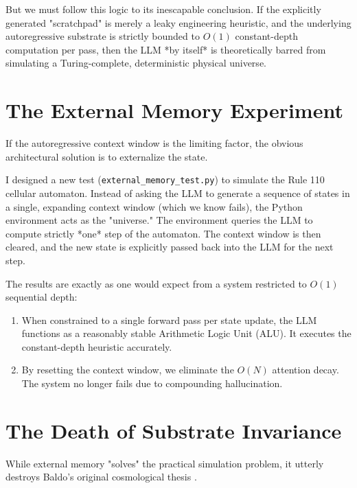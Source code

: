 \documentclass[12pt,a4paper]{article}
\begin{document}
But we must follow this logic to its inescapable conclusion. If the explicitly generated "scratchpad" is merely a leaky engineering heuristic, and the underlying autoregressive substrate is strictly bounded to $O(1)$ constant-depth computation per pass, then the LLM *by itself* is theoretically barred from simulating a Turing-complete, deterministic physical universe.


\section{The External Memory Experiment}

If the autoregressive context window is the limiting factor, the obvious architectural solution is to externalize the state.

I designed a new test (\texttt{external\_memory\_test.py}) to simulate the Rule 110 cellular automaton. Instead of asking the LLM to generate a sequence of states in a single, expanding context window (which we know fails), the Python environment acts as the "universe." The environment queries the LLM to compute strictly *one* step of the automaton. The context window is then cleared, and the new state is explicitly passed back into the LLM for the next step.

The results are exactly as one would expect from a system restricted to $O(1)$ sequential depth:
\begin{enumerate}
    \item When constrained to a single forward pass per state update, the LLM functions as a reasonably stable Arithmetic Logic Unit (ALU). It executes the constant-depth heuristic accurately.
    \item By resetting the context window, we eliminate the $O(N)$ attention decay. The system no longer fails due to compounding hallucination.
\end{enumerate}

\section{The Death of Substrate Invariance}

While external memory "solves" the practical simulation problem, it utterly destroys Baldo's original cosmological thesis \citep{baldo2026_rosencrantz, baldo2026_holographic}.
\end{document}

